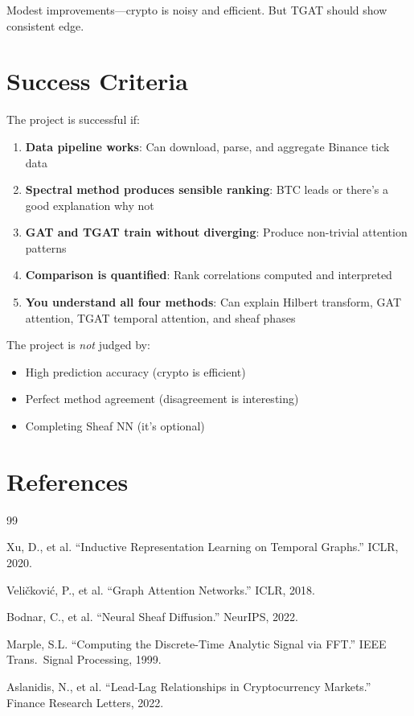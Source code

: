 \documentclass[11pt, a4paper]{article}
\begin{document}
Modest improvements---crypto is noisy and efficient. But TGAT should show consistent edge.

\section{Success Criteria}

The project is successful if:

\begin{enumerate}
    \item \textbf{Data pipeline works}: Can download, parse, and aggregate Binance tick data
    \item \textbf{Spectral method produces sensible ranking}: BTC leads or there's a good explanation why not
    \item \textbf{GAT and TGAT train without diverging}: Produce non-trivial attention patterns
    \item \textbf{Comparison is quantified}: Rank correlations computed and interpreted
    \item \textbf{You understand all four methods}: Can explain Hilbert transform, GAT attention, TGAT temporal attention, and sheaf phases
\end{enumerate}

The project is \emph{not} judged by:
\begin{itemize}
    \item High prediction accuracy (crypto is efficient)
    \item Perfect method agreement (disagreement is interesting)
    \item Completing Sheaf NN (it's optional)
\end{itemize}

\section{References}

\begin{thebibliography}{99}

 Xu, D., et al. ``Inductive Representation Learning on Temporal Graphs.'' ICLR, 2020.

 Veli\v{c}kovi\'{c}, P., et al. ``Graph Attention Networks.'' ICLR, 2018.

 Bodnar, C., et al. ``Neural Sheaf Diffusion.'' NeurIPS, 2022.

 Marple, S.L. ``Computing the Discrete-Time Analytic Signal via FFT.'' IEEE Trans.\ Signal Processing, 1999.

 Aslanidis, N., et al. ``Lead-Lag Relationships in Cryptocurrency Markets.'' Finance Research Letters, 2022.

\end{thebibliography}
\end{document}
